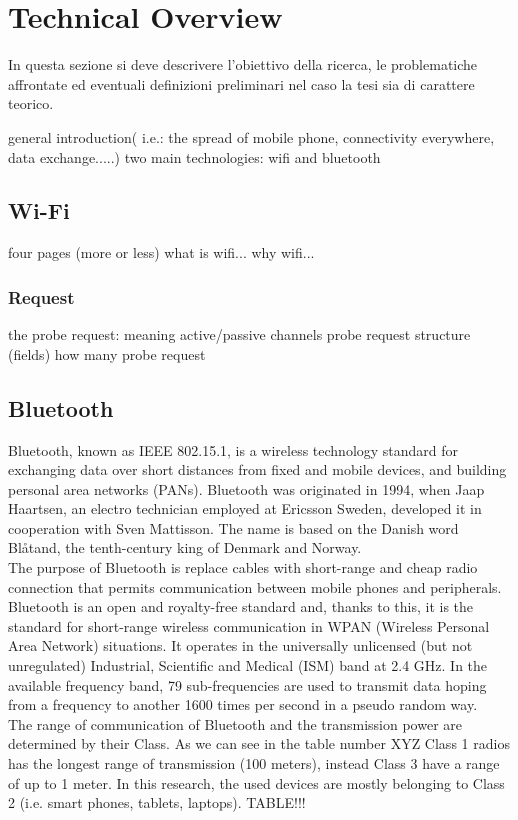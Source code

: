 \chapter{Technical Overview}
\label{chapter 3}
\thispagestyle{empty}


\noindent In questa sezione si deve descrivere l'obiettivo della ricerca, le problematiche affrontate ed eventuali definizioni preliminari nel caso la tesi sia di carattere teorico.

general introduction( i.e.: the spread of mobile phone, connectivity everywhere, data exchange.....)
two main technologies: wifi and bluetooth

\section{Wi-Fi}
four pages (more or less)
what is wifi...
why wifi...
\subsection{Request}
the probe request: meaning
active/passive
channels
probe request structure (fields)
how many probe request


\section{Bluetooth}
Bluetooth, known as IEEE 802.15.1, is a wireless technology standard for exchanging data over short distances from fixed and mobile devices, and building personal area networks (PANs).
Bluetooth was originated in 1994, when Jaap Haartsen, an electro technician employed at Ericsson Sweden, developed it in cooperation with Sven Mattisson. The name is based on the Danish word Bl\r{a}tand, the tenth-century king of Denmark and Norway. \\
The purpose of Bluetooth is replace cables with short-range and cheap radio connection that permits communication between mobile phones and peripherals.\\
Bluetooth is an open and royalty-free standard and, thanks to this, it is the standard for short-range wireless communication in WPAN (Wireless Personal Area Network) situations.
It operates in the universally unlicensed (but not unregulated) Industrial, Scientific and Medical (ISM) band at 2.4 GHz.
In the available frequency band, 79 sub-frequencies are used to transmit data hoping from a frequency to another 1600 times per second in a pseudo random way.\\
\linebreak
The range of communication of Bluetooth and the transmission power are determined by their Class. As we can see in the table number XYZ Class 1 radios has the longest range of transmission (100 meters), instead Class 3 have a range of up to 1 meter. 
In this research, the used devices are mostly belonging to Class 2 (i.e. smart phones, tablets, laptops).
TABLE!!!

